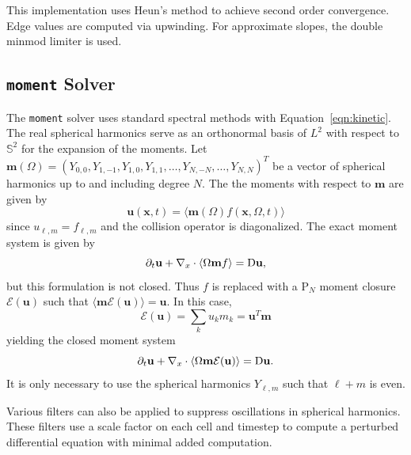 \documentclass{article}
\newcommand{\integral}[1]{\ensuremath{\langle #1 \rangle}}
\newcommand{\closure}[1]{\ensuremath{\mathcal{E}(#1)}}
\newcommand{\twosphere}{\ensuremath{\mathbb{S}^2}\xspace}
\newcommand{\moment}{\texttt{moment}\xspace}
\begin{document}
This implementation uses Heun's method to achieve second order convergence. Edge values
are computed via upwinding. For approximate slopes, the double minmod limiter is used.

\subsection{\moment Solver}
The \moment solver uses standard spectral methods with Equation~\ref{eqn:kinetic}. The real
spherical harmonics serve as an orthonormal basis of $L^2$ with respect to
\twosphere for the expansion of the moments. Let
$\mathbf{m}(\Omega) =
(Y_{0,0}, Y_{1,-1}, Y_{1,0}, Y_{1,1}, \dots, Y_{N,-N}, \dots, Y_{N,N})^T$
be a vector of spherical harmonics up to and including degree $N$. The the moments
with respect to $\mathbf{m}$ are given by
\begin{equation}
    \mathbf{u}(\mathbf{x}, t) =
    \integral{\mathbf{m}(\Omega) f(\mathbf{x}, \Omega, t)}
\end{equation}
since $u_{\ell,m} = f_{\ell,m}$ and the collision operator is diagonalized.
The exact moment system is given by
\begin{equation}
    \partial_t \mathbf{u} + \nabla_x \cdot \integral{\Omega\mathbf{m}f} =
    \Dif \mathbf{u},
\end{equation}
but this formulation is not closed. Thus $f$ is replaced with a $\mathrm{P}_N$
moment closure $\closure{\mathbf{u}}$ such that
$\integral{\mathbf{m}\closure{\mathbf{u}}} = \mathbf{u}$. In this case,
\begin{equation}
    \closure{\mathbf{u}} = \sum_k u_k m_k = \mathbf{u}^T \mathbf{m}
\end{equation}
yielding the closed moment system
\begin{equation}
    \partial_t \mathbf{u} + \nabla_x \cdot
    \integral{\Omega\mathbf{m}\closure{\mathbf{u}}} = \Dif \mathbf{u}.
\end{equation}
It is only necessary to use the spherical harmonics $Y_{\ell,m}$ such that
$\ell + m$ is even.

Various filters can also be applied to suppress oscillations in spherical harmonics.
These filters use a scale factor on each cell and timestep to compute a
perturbed differential equation with minimal added computation.
\end{document}
